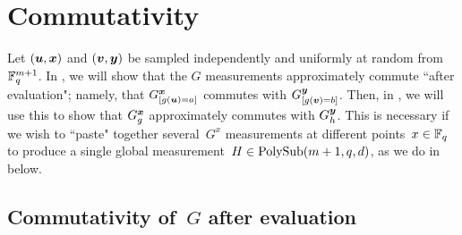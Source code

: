 
\section{Commutativity}
\label{sec:g-comm}

Let $(\boldsymbol{u}, {\boldsymbol{x}})$ and $(\boldsymbol{v}, \boldsymbol{y})$ be sampled independently and uniformly at random from $\mathbb F_q^{m+1}$.
In ,
we will show that the $G$ measurements approximately commute ``after evaluation";
namely, that $G^{{\boldsymbol{x}}}_{[g(\boldsymbol{u})=a]}$ commutes with $G^{\boldsymbol{y}}_{[g(\boldsymbol{v})=b]}$.
Then, in ,
we will use this to show that $G^{{\boldsymbol{x}}}_g$ approximately commutes with $G^{\boldsymbol{y}}_h$.
This is necessary if we wish to ``paste" together several~$G^x$ measurements at different points~$x \in \mathbb F_q$
to produce a single global measurement~$H \in \mathrm{PolySub}(m+1, q, d)$, as we do in  below.

\subsection{Commutativity of~$G$ after evaluation}\label{sec:G-commutes-after-evaluation}

